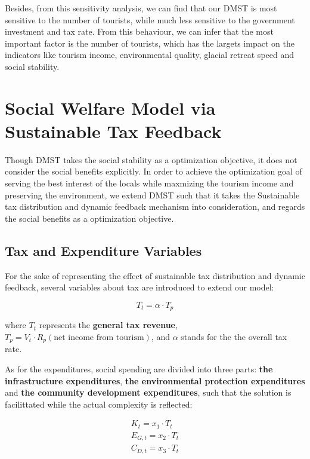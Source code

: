 \documentclass{mcmthesis}
\begin{document}
Besides, from this sensitivity analysis, we can find that our DMST is most sensitive to 
the number of tourists, while much less sensitive to the government investment and tax rate.
From this behaviour, we can infer that the most important factor is the number of tourists, 
which has the largets impact on the indicators like tourism income, environmental quality, 
glacial retreat speed and social stability.

\section{Social Welfare Model via Sustainable Tax Feedback}
Though DMST takes the social stability as a optimization objective, it does not consider the social benefits explicitly. 
In order to achieve the optimization goal of serving the best interest of the locals while maxmizing the tourism income 
and preserving the environment, we extend DMST such that it takes the Sustainable tax distribution and dynamic feedback mechanism\cite{bayer2004sterman}
into consideration, and regards the social benefits as a optimization objective.

\subsection{Tax and Expenditure Variables}
For the sake of representing the effect of sustainable tax distribution and dynamic feedback, 
several variables about tax are introduced to extend our model:

\begin{equation}
  T_t = \alpha \cdot T_p
\end{equation}

where $T_t$ represents the \textbf{general tax revenue}, $T_p = V_t \cdot R_p (\text{net income from tourism})$, 
and $\alpha$ stands for the the overall tax rate.

As for the expenditures, social spending are divided into three parts: \textbf{the infrastructure expenditures}, 
\textbf{the environmental protection expenditures} and \textbf{the community development expenditures}, 
such that the solution is facilittated while the actual complexity is reflected:

\begin{gather}
  K_t = x_1 \cdot T_t  \\
  E_{G,t} = x_2 \cdot T_t  \\
  C_{D,t} = x_3 \cdot T_t 
\end{gather}
\end{document}
